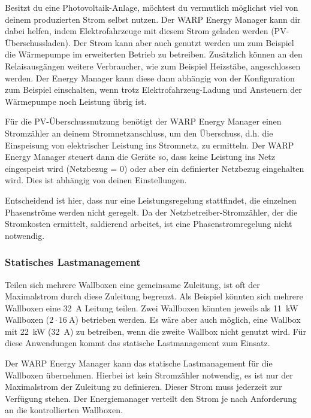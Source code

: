 \documentclass[a4paper,10pt]{article}
\begin{document}
\begin{multicols*}{2}
	Besitzt du eine Photovoltaik-Anlage, möchtest du vermutlich möglichst viel
	von deinem produzierten Strom selbst nutzen. Der WARP Energy Manager kann
	dir dabei helfen, indem Elektrofahrzeuge mit diesem Strom geladen werden (PV-Überschussladen).
    Der Strom kann aber auch genutzt werden um zum Beispiel die Wärmepumpe im erweiterten Betrieb 
    zu betreiben. Zusätzlich können an den Relaisausgängen weitere Verbraucher, wie zum Beispiel Heizstäbe,
    angeschlossen werden. Der Energy Manager kann diese dann abhängig von der Konfiguration zum Beispiel einschalten, wenn trotz 
    Elektrofahrzeug-Ladung und Ansteuern der Wärmepumpe noch Leistung übrig ist.

	Für die PV-Überschussnutzung benötigt der WARP Energy Manager einen Stromzähler
	an deinem Stromnetzanschluss, um den Überschuss, d.h. die Einspeisung von
	elektrischer Leistung ins Stromnetz, zu ermitteln. Der WARP Energy Manager
	steuert dann die Geräte so, dass keine Leistung ins Netz eingespeist wird
	(Netzbezug = 0) oder aber ein definierter Netzbezug eingehalten wird. Dies
	ist abhängig von deinen Einstellungen.

	Entscheidend ist hier, dass nur eine Leistungsregelung stattfindet, 
    die einzelnen Phasenströme werden nicht geregelt. Da der Netzbetreiber-Stromzähler,
	der die Stromkosten ermittelt, saldierend arbeitet, ist eine Phasenstromregelung nicht notwendig.

	\vspace{-0.05cm}
	\subsubsection{Statisches Lastmanagement}
	\label{statisches_lastmanagement}

	Teilen sich mehrere Wallboxen eine gemeinsame Zuleitung, ist oft der
	Maximalstrom durch diese Zuleitung begrenzt. Als Beispiel könnten sich mehrere
	Wallboxen eine \SI{32}{\ampere} Leitung teilen. Zwei Wallboxen könnten jeweils als \SI{11}{\kilo\watt}
	Wallboxen ($2\cdot\SI{16}{\ampere}$) betrieben werden. Es wäre aber auch möglich, eine
	Wallbox mit \SI{22}{\kilo\watt} (\SI{32}{\ampere}) zu betreiben, wenn die zweite Wallbox nicht genutzt
	wird. Für diese Anwendungen kommt das statische Lastmanagement zum Einsatz.

	Der WARP Energy Manager kann das statische Lastmanagement für die Wallboxen
	übernehmen. Hierbei ist kein Stromzähler notwendig, es ist nur der
	Maximalstrom der Zuleitung zu definieren. Dieser Strom muss jederzeit zur
	Verfügung stehen. Der Energiemanager verteilt den Strom
	je nach Anforderung an die kontrollierten Wallboxen.


\end{multicols*}
\end{document}
